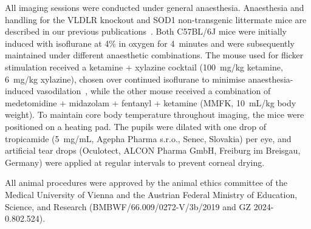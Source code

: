 \documentclass{optica-article}
\begin{document}
All imaging sessions were conducted under general anaesthesia. Anaesthesia and handling for the VLDLR knockout and SOD1 non-transgenic littermate mice are described in our previous publications~\cite{augustinMultifunctionalOCTEnables2016,augustinOpticalCoherenceTomography2020}. Both C57BL/6J mice were initially induced with isoflurane at 4\% in oxygen for 4~minutes and were subsequently maintained under different anaesthetic combinations. The mouse used for flicker stimulation received a ketamine + xylazine cocktail (100~mg/kg ketamine, 6~mg/kg xylazine), chosen over continued isoflurane to minimise anaesthesia-induced vasodilation~\cite{sullenderDynamicsIsofluraneInduced2022,wormRetinalOCTParameters2026}, while the other mouse received a combination of medetomidine + midazolam + fentanyl + ketamine (MMFK, 10~mL/kg body weight). To maintain core body temperature throughout imaging, the mice were positioned on a heating pad. The pupils were dilated with one drop of tropicamide (5~mg/mL, Agepha Pharma s.r.o., Senec, Slovakia) per eye, and artificial tear drops (Oculotect, ALCON Pharma GmbH, Freiburg im Breisgau, Germany) were applied at regular intervals to prevent corneal drying.

All animal procedures were approved by the animal ethics committee of the Medical University of Vienna and the Austrian Federal Ministry of Education, Science, and Research (BMBWF/66.009/0272-V/3b/2019 and GZ 2024-0.802.524).
\end{document}
